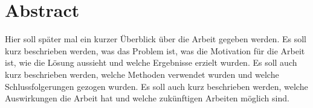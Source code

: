 \section*{Abstract}
\label{sec:Abstract}
Hier soll später mal ein kurzer Überblick über die Arbeit gegeben werden. Es soll kurz beschrieben werden, was das Problem ist, was die Motivation für die Arbeit ist, wie die Lösung aussieht und welche Ergebnisse erzielt wurden. Es soll auch kurz beschrieben werden, welche Methoden verwendet wurden und welche Schlussfolgerungen gezogen wurden. Es soll auch kurz beschrieben werden, welche Auswirkungen die Arbeit hat und welche zukünftigen Arbeiten möglich sind.    
\cite{Wille}
\newpage
